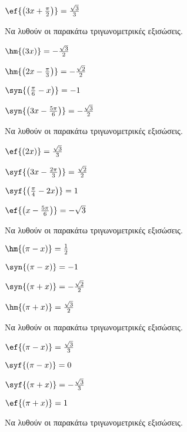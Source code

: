 \begin{multicols}{2}
\begin{rlist}
\item $ \ef{\left(3x+\frac{\pi}{2}\right)}=\frac{\sqrt{3}}{3} $
\end{rlist}
\Askhsh 
Να λυθούν οι παρακάτω τριγωνομετρικές εξισώσεις.
\begin{rlist}
\item $ \hm{(3x)}=-\frac{\sqrt{3}}{2} $
\item $ \hm{\left(2x-\frac{\pi}{3}\right) }=-\frac{\sqrt{2}}{2} $
\item $ \syn{\left(\frac{\pi}{6}-x\right) }=-1 $
\item $ \syn{\left(3x-\frac{5\pi}{6}\right) }=-\frac{\sqrt{3}}{2} $
\end{rlist}
\Askhsh 
Να λυθούν οι παρακάτω τριγωνομετρικές εξισώσεις.
\begin{rlist}
\item $ \ef{(2x)}=\frac{\sqrt{3}}{3} $
\item $ \syf{\left(3x-\frac{2\pi}{3}\right) }=\frac{\sqrt{2}}{2} $
\item $ \syf{\left(\frac{\pi}{4}-2x\right) }=1 $
\item $ \ef{\left(x-\frac{5\pi}{6}\right) }=-\sqrt{3} $
\end{rlist}
\Askhsh 
Να λυθούν οι παρακάτω τριγωνομετρικές εξισώσεις.
\begin{rlist}
\item $ \hm{\left( \pi-x\right) }=\frac{1}{2} $
\item $ \syn{\left(\pi-x\right) }=-1 $
\item $ \syn{\left(\pi+x\right) }=-\frac{\sqrt{2}}{2} $
\item $ \hm{\left(\pi+x \right) }=\frac{\sqrt{3}}{2} $
\end{rlist}
\Askhsh 
Να λυθούν οι παρακάτω τριγωνομετρικές εξισώσεις.
\begin{multicols}{2}
\begin{rlist}[leftmargin=2mm]
\item $ \ef{\left( \pi-x\right) }=\frac{\sqrt{3}}{3} $
\item $ \syf{\left(\pi-x\right) }=0 $
\item $ \syf{\left(\pi+x\right) }=-\frac{\sqrt{3}}{3} $
\item $ \ef{\left(\pi+x \right) }=1 $
\end{rlist}
\end{multicols}
\Askhsh 
Να λυθούν οι παρακάτω τριγωνομετρικές εξισώσεις.
\begin{multicols}{2}
\begin{rlist}[leftmargin=3mm]

\end{rlist}
\end{multicols}
\end{multicols}

